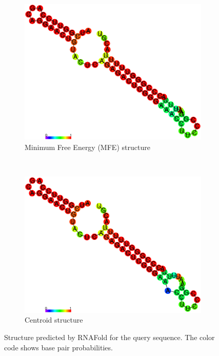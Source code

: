 \documentclass[10pt,a4paper]{article}
\begin{document}
\begin{figure}[!h]
    \centering
    \begin{subfigure}[b]{0.4\textwidth}
\includegraphics[width = \textwidth]{figures/sequence2_pp.eps}
        \caption{Minimum Free Energy (MFE) structure}
        \label{fig:MFE_2}
    \end{subfigure}
~
\begin{subfigure}[b]{0.4\textwidth}
\includegraphics[width = \textwidth]{figures/sequence2_centroid_pp}
        \caption{Centroid structure}
        \label{fig:CNT_2}
    \end{subfigure}
\caption{Structure predicted by RNAFold for the query sequence. The color code shows base pair probabilities.}
\end{figure}
\end{document}
